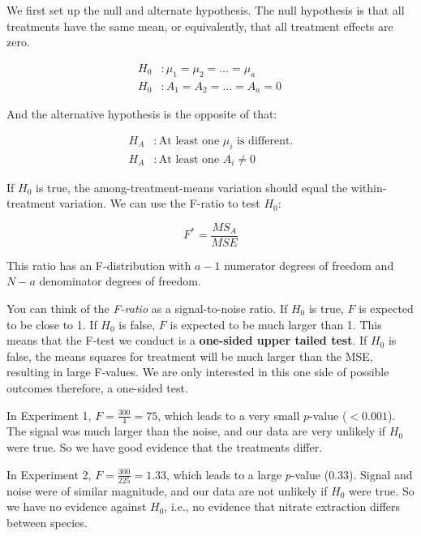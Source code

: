 \documentclass[
  letterpaper,
]{book}
\begin{document}
We first set up the null and alternate hypothesis. The null hypothesis
is that all treatments have the same mean, or equivalently, that all
treatment effects are zero.

\[
\begin{aligned}
H_0&: \mu_1 = \mu_2 = \ldots = \mu_a \\
H_0&: A_1 = A_2 = \ldots = A_a = 0\
\end{aligned}
\]

And the alternative hypothesis is the opposite of that:

\[
\begin{aligned}
H_A&: \text{At least one } \mu_i \text{ is different.} \\
H_A&: \text{At least one } A_i \neq 0
\end{aligned}
\]


If \(H_0\) is true, the among-treatment-means variation should equal the
within-treatment variation. We can use the F-ratio to test \(H_0\):

\[ F^* = \frac{MS_A}{MSE} \]

This ratio has an F-distribution with \(a-1\) numerator degrees of
freedom and \(N-a\) denominator degrees of freedom.

You can think of the \emph{F-ratio} as a signal-to-noise ratio. If
\(H_0\) is true, \(F\) is expected to be close to 1. If \(H_0\) is
false, \(F\) is expected to be much larger than 1. This means that the
F-test we conduct is a \textbf{one-sided upper tailed test}. If \(H_0\)
is false, the means squares for treatment will be much larger than the
MSE, resulting in large F-values. We are only interested in this one
side of possible outcomes therefore, a one-sided test.

In Experiment 1, \(F = \frac{300}{4} = 75\), which leads to a very small
\(p\)-value (\(< 0.001\)). The signal was much larger than the noise,
and our data are very unlikely if \(H_0\) were true. So we have good
evidence that the treatments differ.

In Experiment 2, \(F = \frac{300}{225} = 1.33\), which leads to a large
\(p\)-value (\(0.33\)). Signal and noise were of similar magnitude, and
our data are not unlikely if \(H_0\) were true. So we have no evidence
against \(H_0\), i.e., no evidence that nitrate extraction differs
between species.
\end{document}
